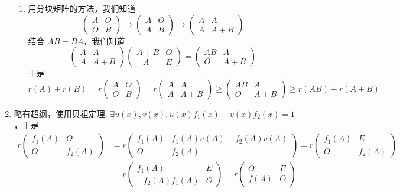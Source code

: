 \begin{enumerate}
\begin{enumerate}
              \item 用分块矩阵的方法，我们知道
                    \[\begin{pmatrix}A & O \\ O & B\end{pmatrix}\rightarrow \begin{pmatrix}A & O \\ A & B\end{pmatrix}\rightarrow \begin{pmatrix}A & A \\ A & A+B\end{pmatrix}\]
                    结合 $AB=BA$，我们知道
                    \[\begin{pmatrix}A & A \\ A & A+B\end{pmatrix}\begin{pmatrix}A+B & O \\ -A & E\end{pmatrix}=\begin{pmatrix}AB & A \\ O & A+B\end{pmatrix}\]
                    于是
                    \[r(A)+r(B)=r\begin{pmatrix}A & O \\ O & B\end{pmatrix}=r\begin{pmatrix}A & A \\ A & A+B\end{pmatrix}\geqslant \begin{pmatrix}AB & A \\ O & A+B\end{pmatrix}\geqslant r(AB)+r(A+B)\]
          \end{enumerate}

    \item 略有超纲，使用贝祖定理. $\exists u(x),v(x),u(x)f_1(x)+v(x)f_2(x)=1 $，于是
          \begin{align*}
              r\begin{pmatrix}f_1(A) & O \\ O & f_2(A)\end{pmatrix} & = r\begin{pmatrix}f_1(A) & f_1(A)u(A)+f_2(A)v(A) \\ O & f_2(A)\end{pmatrix}=r\begin{pmatrix}f_1(A) & E \\ O & f_2(A)\end{pmatrix} \\
                                                                    & =r\begin{pmatrix}f_1(A) & E \\ -f_2(A)f_1(A) & O\end{pmatrix}=r\begin{pmatrix}O & E \\ f(A) & O\end{pmatrix}
          \end{align*}


\end{enumerate}
